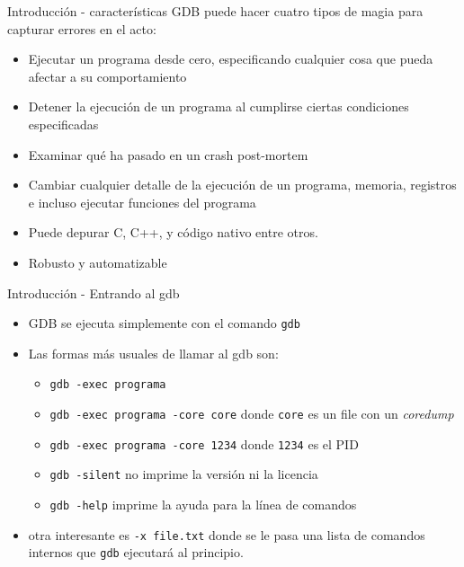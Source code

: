 \documentclass[xetex]{beamer}
\begin{document}
\begin{frame}{Introducción - características}
 GDB puede hacer cuatro tipos de magia para capturar errores en el acto:
\begin{itemize}
\item Ejecutar un programa desde cero, especificando  cualquier  cosa  que  pueda
afectar a su comportamiento
\item Detener la ejecución de un programa al cumplirse ciertas condiciones
especificadas
\item Examinar qué ha pasado en un crash post-mortem
\item Cambiar cualquier detalle de la ejecución de un programa, memoria, registros e incluso ejecutar funciones del programa
\item Puede depurar C, C++, y código nativo entre otros.
\item Robusto y automatizable
\end{itemize}
\end{frame}

\begin{frame}[fragile]{Introducción - Entrando al gdb}
\begin{itemize}
\item GDB se ejecuta simplemente con el comando \verb=gdb=
\item Las formas más usuales de llamar al gdb son:
\begin{itemize}
\item \verb=gdb -exec programa=
\item \verb=gdb -exec programa -core core= donde \verb=core= es un file con un {\it coredump}
\item \verb=gdb -exec programa -core 1234= donde \verb=1234= es el PID
\item \verb=gdb -silent= no imprime la versión ni la licencia
\item \verb=gdb -help= imprime la ayuda para la línea de comandos
\end{itemize}
\item otra interesante es \verb=-x file.txt= donde se le pasa una lista de comandos internos que \verb=gdb= ejecutará al principio.
\end{itemize}

\end{frame}
\end{document}
